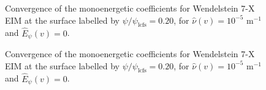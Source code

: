 \begin{figure}[h]	
	\begin{subfigure}[b]{0.33\textwidth}
		
	\end{subfigure}
	\begin{subfigure}[b]{0.33\textwidth}	
		
		\end{subfigure}
		\begin{subfigure}[b]{0.33\textwidth}	
			
		\end{subfigure}
		\caption{Convergence of the monoenergetic coefficients for Wendelstein 7-X EIM at the surface labelled by $\psi/\psi_{\text{lcfs}}=0.20$, for $\hat{\nu}(v)=10^{-5}$ $\text{m}^{-1}$ and $\hat{E}_\psi(v)=0$.}
\end{figure}

\begin{figure}[]	
	\begin{subfigure}[b]{0.33\textwidth}
		
	\end{subfigure}
    \caption{Convergence of the monoenergetic coefficients for Wendelstein 7-X EIM at the surface labelled by $\psi/\psi_{\text{lcfs}}=0.20$, for $\hat{\nu}(v)=10^{-5}$ $\text{m}^{-1}$ and $\hat{E}_\psi(v)=0$.}
\end{figure}